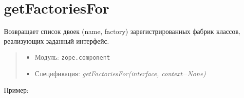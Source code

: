 \documentclass[a4paper,openany,twoside,final]{book}
\providecommand*{\DUroletitlereference}[1]{\textsl{#1}}
\begin{document}
\section*{getFactoriesFor%
  \label{getfactoriesfor}%
}

Возвращает список двоек (name, factory) зарегистрированных фабрик
классов, реализующих заданный интерфейс.

\begin{quote}

\begin{itemize}

\item Модуль: \texttt{zope.component}

\item Спецификация: \DUroletitlereference{getFactoriesFor(interface, context=None)}

\end{itemize}

\end{quote}

Пример:
\end{document}
